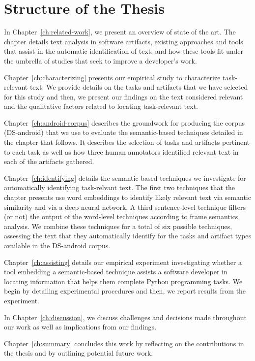 \section{Structure of the Thesis}
\label{cp1:organization}

 

In Chapter~\ref{ch:related-work}, we present an overview of state of the art. The chapter details 
text analysis in software artifacts, existing approaches and tools 
that assist in the automatic
identification of text, and how these tools fit under the 
umbrella of studies that seek to 
improve a developer's work.


Chapter~\ref{ch:characterizing} presents our empirical study to characterize task-relevant text.
We provide details on the tasks and artifacts that we have selected for this study
and then, we present our findings on the text considered relevant 
and the qualitative factors related to locating task-relevant text.


Chapter~\ref{ch:android-corpus} describes the groundwork 
for producing the corpus (\acs{DS-android}) that we use to evaluate the semantic-based techniques 
detailed in the chapter that follows. It describes the selection of tasks 
and 
artifacts pertinent to each task 
as well as how three human annotators identified relevant text in each of the artifacts gathered.


Chapter~\ref{ch:identifying} details the semantic-based techniques we investigate for automatically 
identifying task-relvant text.
The first two techniques that the chapter presents 
use word embeddings to identify likely relevant text via semantic similarity
and via a deep neural network.
A third sentence-level technique filters (or not) 
the output of the word-level techniques according to frame semantics analysis.
We combine these techniques for a total of six possible techniques, 
assessing 
the text that they automatically identify for the tasks and artifact types
available in the \acs{DS-android} corpus.




Chapter~\ref{ch:assisting} details our empirical experiment investigating 
whether a tool embedding a semantic-based technique assists a software developer in locating information
that helps them complete Python programming tasks. We begin by detailing experimental procedures
and then, we report results from the experiment.


In Chapter~\ref{ch:discussion}, we discuss challenges and decisions 
made throughout our work 
as well as implications from our findings. 


Chapter~\ref{ch:summary} concludes this work by reflecting on the contributions in the thesis
and by outlining  potential future work. 
